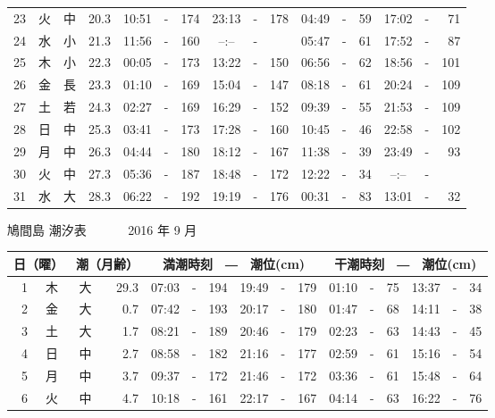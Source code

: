 \documentclass[12pt.a4j]{jsarticle}
\begin{document}
\begin{center}
\begin{table}[ht]
\begin{tabular}{|rc|cr|ccrccr|ccrccr|}
23 & 火 & 中 & 20.3 &  10:51 &-& 174  &  23:13 &-& 178  &   04:49 &-&  59  &   17:02 &-&  71  \\
24 & 水 & 小 & 21.3 &  11:56 &-& 160  &  --:-- &-&     &   05:47 &-&  61  &   17:52 &-&  87  \\
25 & 木 & 小 & 22.3 &  00:05 &-& 173  &  13:22 &-& 150  &   06:56 &-&  62  &   18:56 &-& 101  \\
26 & 金 & 長 & 23.3 &  01:10 &-& 169  &  15:04 &-& 147  &   08:18 &-&  61  &   20:24 &-& 109  \\
27 & 土 & 若 & 24.3 &  02:27 &-& 169  &  16:29 &-& 152  &   09:39 &-&  55  &   21:53 &-& 109  \\
28 & 日 & 中 & 25.3 &  03:41 &-& 173  &  17:28 &-& 160  &   10:45 &-&  46  &   22:58 &-& 102  \\
29 & 月 & 中 & 26.3 &  04:44 &-& 180  &  18:12 &-& 167  &   11:38 &-&  39  &   23:49 &-&  93  \\
30 & 火 & 中 & 27.3 &  05:36 &-& 187  &  18:48 &-& 172  &   12:22 &-&  34  &   --:-- &-&     \\
31 & 水 & 大 & 28.3 &  06:22 &-& 192  &  19:19 &-& 176  &   00:31 &-&  83  &   13:01 &-&  32  \\
   \hline
   \end{tabular}
\end{table}
\newpage
 {\LARGE 鳩間島  潮汐表　　　}
 {\large 2016 年  9 月}\\
 \begin{table}[ht]
    \begin{tabular}{|rc|cr|ccrccr|ccrccr|}
    \hline
    \multicolumn{2}{|c|}{日（曜）} & \multicolumn{2}{c|}{潮（月齢）} & \multicolumn{6}{c|}{満潮時刻　―　潮位(cm)} & \multicolumn{6}{c|}{干潮時刻　―　潮位(cm)} \\
 \hline
 1 & 木 & 大 & 29.3 &  07:03 &-& 194  &  19:49 &-& 179  &   01:10 &-&  75  &   13:37 &-&  34  \\
 2 & 金 & 大 &  0.7 &  07:42 &-& 193  &  20:17 &-& 180  &   01:47 &-&  68  &   14:11 &-&  38  \\
 3 & 土 & 大 &  1.7 &  08:21 &-& 189  &  20:46 &-& 179  &   02:23 &-&  63  &   14:43 &-&  45  \\
 4 & 日 & 中 &  2.7 &  08:58 &-& 182  &  21:16 &-& 177  &   02:59 &-&  61  &   15:16 &-&  54  \\
 5 & 月 & 中 &  3.7 &  09:37 &-& 172  &  21:46 &-& 172  &   03:36 &-&  61  &   15:48 &-&  64  \\
 6 & 火 & 中 &  4.7 &  10:18 &-& 161  &  22:17 &-& 167  &   04:14 &-&  63  &   16:22 &-&  76  \\

\end{tabular}
\end{table}
\end{center}
\end{document}

